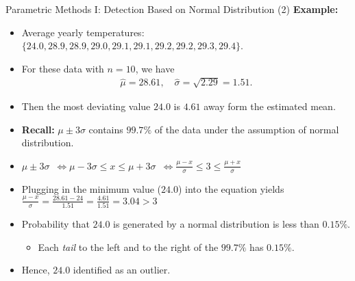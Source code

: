 \begin{frame}{Parametric Methods I: Detection Based on Normal Distribution (2)}
	\textbf{Example:}
	\begin{itemize}
		\item Average yearly temperatures: $\{24.0, 28.9, 28.9, 29.0, 29.1, 29.1, 29.2, 29.2, 29.3, 29.4\}$.
		\item For these data with $n = 10$, we have
		      \begin{align*}
			      \widehat{\mu}=28.61, \quad \widehat{\sigma}=\sqrt{2.29}=1.51.
		      \end{align*}
		\item Then the most deviating value $24.0$ is $4.61$ away form the estimated mean.
		\item \textbf{Recall:} $\mu \pm 3\sigma $ contains $99.7\%$ of the data under the assumption of normal distribution.
		\item $\mu \pm 3\sigma$\pause~$ \Leftrightarrow \mu - 3\sigma \leq x \le \mu + 3\sigma$\pause~$ \Leftrightarrow \frac{\mu - x}{\sigma} \leq 3 \leq \frac{\mu + x}{\sigma}$
		\item Plugging in the minimum value ($24.0$) into the equation yields $\frac{\mu-x}{\sigma} = \frac{28.61 - 24}{1.51} =\frac{4.61}{1.51}  =  3.04  >  3$
		\item Probability that $24.0$ is generated by a normal distribution is less than $0.15\%$.
		      \begin{itemize}
			      \item Each \emph{tail} to the left and to the right of the $99.7\%$ has $0.15\%$.
		      \end{itemize}
		\item Hence, $24.0$ identified as an outlier.
	\end{itemize}
\end{frame}


